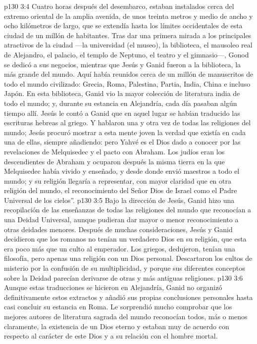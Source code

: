 \vs p130 3:4 \pc Cuatro horas después del desembarco, estaban instalados cerca del extremo oriental de la amplia avenida, de unos treinta metros y medio de ancho y ocho kilómetros de largo, que se extendía hasta los límites occidentales de esta ciudad de un millón de habitantes. Tras dar una primera mirada a los principales atractivos de la ciudad ---la universidad (el museo), la biblioteca, el mausoleo real de Alejandro, el palacio, el templo de Neptuno, el teatro y el gimnasio---, Gonod se dedicó a sus negocios, mientras que Jesús y Ganid fueron a la biblioteca, la más grande del mundo. Aquí había reunidos cerca de un millón de manuscritos de todo el mundo civilizado: Grecia, Roma, Palestina, Partia, India, China e incluso Japón. En esta biblioteca, Ganid vio la mayor colección de literatura india de todo el mundo; y, durante su estancia en Alejandría, cada día pasaban algún tiempo allí. Jesús le contó a Ganid que en aquel lugar se habían traducido las escrituras hebreas al griego. Y hablaron una y otra vez de todas las religiones del mundo; Jesús procuró mostrar a esta mente joven la verdad que existía en cada una de ellas, siempre añadiendo: pero Yahvé es el Dios dado a conocer por las revelaciones de Melquisedec y el pacto con Abraham. Los judíos eran los descendientes de Abraham y ocuparon después la misma tierra en la que Melquisedec había vivido y enseñado, y desde donde envió maestros a todo el mundo; y su religión llegaría a representar, con mayor claridad que en otra religión del mundo, el reconocimiento del Señor Dios de Israel como el Padre Universal de los cielos”.
\vs p130 3:5 \pc Bajo la dirección de Jesús, Ganid hizo una recopilación de las enseñanzas de todas las religiones del mundo que reconocían a una Deidad Universal, aunque pudieran dar mayor o menor reconocimiento a otras deidades menores. Después de muchas consideraciones, Jesús y Ganid decidieron que los romanos no tenían un verdadero Dios en su religión, que esta era poco más que un culto al emperador. Los griegos, dedujeron, tenían una filosofía, pero apenas una religión con un Dios personal. Descartaron los cultos de misterio por la confusión de su multiplicidad, y porque sus diferentes conceptos sobre la Deidad parecían derivarse de otras y más antiguas religiones.
\vs p130 3:6 Aunque estas traducciones se hicieron en Alejandría, Ganid no organizó definitivamente estos extractos y añadió sus propias conclusiones personales hasta casi concluir su estancia en Roma. Le sorprendió mucho comprobar que los mejores autores de literatura sagrada del mundo reconocían todos, más o menos claramente, la existencia de un Dios eterno y estaban muy de acuerdo con respecto al carácter de este Dios y a su relación con el hombre mortal.
